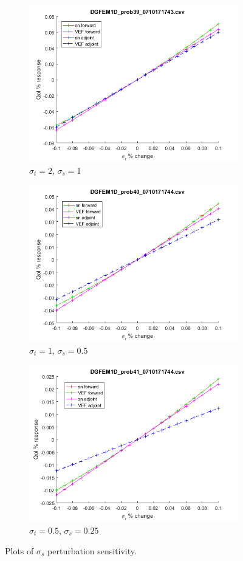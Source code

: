 \documentclass{article}
\newcommand{\sigt}{\sigma_t}
\newcommand{\sigs}{\sigma_s}
\begin{document}
\begin{figure}[H]
\label{InHomoPerts}
\begin{subfigure}{.5\textwidth}
  \centering
  \includegraphics[width=.8\linewidth]{figures/39sigsSens.png}
  \caption{$\sigt=2$, $\sigs=1$}
  \label{fig:sfig1}
\end{subfigure}%
\begin{subfigure}{.5\textwidth}
  \centering
  \includegraphics[width=.8\linewidth]{figures/40sigsSens.png}
  \caption{$\sigt=1$, $\sigs=0.5$}
  \label{fig:sfig2}
\end{subfigure}
\begin{subfigure}{.5\textwidth}
  \centering
  \includegraphics[width=.8\linewidth]{figures/41sigsSens.png}
  \caption{$\sigt=0.5$, $\sigs=0.25$}
  \label{fig:sfig3}
\end{subfigure}
\caption{Plots of $\sigs$ perturbation sensitivity.}
\label{fig:fig}
\end{figure}
\end{document}
